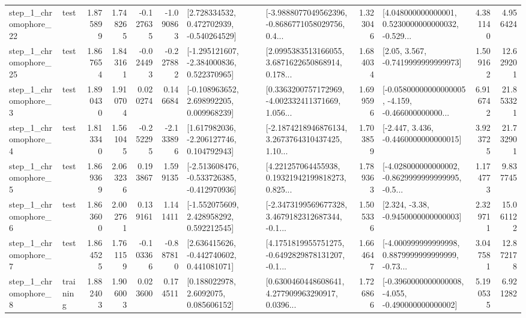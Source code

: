 \begin{tabular}{llrrrrllrlrr}
    step\_1\_chromophore\_22 &      test &      1.875899 &    1.748265 &     -0.127635 & -1.090863 &    [2.728334532, 0.472702939, -0.540264529] &  [-3.9888077049562396, -0.8686771058029756, 0.4... &       1.323046 &  [4.048000000000001, 0.5230000000000032, -0.529... &            4.381140 &          4.956424 \\
    step\_1\_chromophore\_25 &      test &      1.867654 &    1.843161 &     -0.024493 & -0.227882 &   [-1.295121607, -2.384000836, 0.522370965] &  [2.0995383513166055, 3.6871622650868914, 0.178... &       1.684034 &                 [2.05, 3.567, -0.7419999999999973] &            1.509162 &         12.629201 \\
     step\_1\_chromophore\_3 &      test &      1.890430 &    1.910704 &      0.020274 &  0.146684 &    [-0.108963652, 2.698992205, 0.009968239] &  [0.3363200757172969, -4.002332411371669, 1.056... &       1.699596 &  [-0.05800000000000005, -4.159, -0.466000000000... &            6.916742 &         21.853321 \\
     step\_1\_chromophore\_4 &      test &      1.813340 &    1.561045 &     -0.252295 & -2.133896 &    [1.617982036, -2.206127746, 0.104792943] &  [-2.1874218946876134, 3.2673764310437425, 1.10... &       1.703859 &               [-2.447, 3.436, -0.4460000000000015] &            3.923725 &         21.732901 \\
     step\_1\_chromophore\_5 &      test &      1.869369 &    2.063236 &      0.193867 &  1.599135 &  [-2.513608476, -0.533726385, -0.412970936] &  [4.221257064455938, 0.19321942199818273, 0.825... &       1.789363 &  [-4.028000000000002, -0.8629999999999995, -0.5... &            1.174773 &          9.837745 \\
     step\_1\_chromophore\_6 &      test &      1.863600 &    2.002761 &      0.139161 &  1.141411 &    [-1.552075609, 2.428958292, 0.592212545] &  [-2.3473199569677328, 3.4679182312687344, -0.1... &       1.505336 &                [2.324, -3.38, -0.9450000000000003] &            2.329711 &         15.061122 \\
     step\_1\_chromophore\_7 &      test &      1.864525 &    1.761159 &     -0.103366 & -0.887810 &    [2.636415626, -0.442740602, 0.441081071] &  [4.1751819955751275, -0.6492829878131207, -0.1... &       1.664647 &  [-4.000999999999998, 0.8879999999999999, -0.73... &            3.047581 &         12.872178 \\
     step\_1\_chromophore\_8 &  training &      1.882403 &    1.906003 &      0.023600 &  0.174511 &       [0.188022978, 2.6092075, 0.085606152] &  [0.6300460448608641, 4.277909963290917, 0.0396... &       1.726866 &  [-0.3960000000000008, -4.055, -0.490000000000002] &            5.190535 &          6.921282 \\

\end{tabular}
